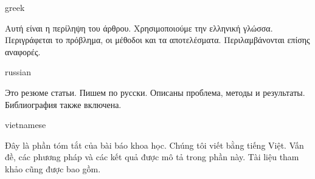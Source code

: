 \documentclass[balance,upint,subscriptcorrection,varvw,mathalfa=cal=boondoxo,spanish,french,vietnamese,russian,greek,pdf-a,fontspec,colorlinks]{asmeconf}
\begin{document}
\ifpdftex
    \begin{selectlanguage}{greek}%
    \begin{abstract*}
    Αυτή είναι η περίληψη του άρθρου. Χρησιμοποιούμε την ελληνική γλώσσα. Περιγράφεται το πρόβλημα, οι μέθοδοι και τα αποτελέσματα. Περιλαμβάνονται επίσης αναφορές.
    \end{abstract*}
    \end{selectlanguage}%
    
    \begin{selectlanguage}{russian}
    \begin{abstract*}
    Это резюме статьи. Пишем по русски. Описаны проблема, методы и результаты. Библиография также включена.%
    \end{abstract*}
    \end{selectlanguage}%
    
    \begin{selectlanguage}{vietnamese}
    \begin{abstract*}
    Đây là phần tóm tắt của bài báo khoa học. Chúng tôi viết bằng tiếng Việt. Vấn đề, các phương pháp và các kết quả được mô tả trong phần này. Tài liệu tham khảo cũng được bao gồm.
    \end{abstract*}
    \end{selectlanguage}%
\fi
   
\end{document}
